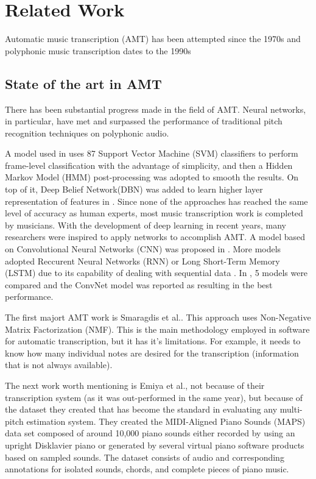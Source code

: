 \newpage
\section{Related Work}

Automatic music transcription (AMT) has been attempted since the 1970s and polyphonic music transcription dates to the 1990s \cite{REF:1}
\par

\subsection{State of the art in AMT}

There has been substantial progress made in the field of AMT. Neural networks, in particular, have met and surpassed the performance of traditional pitch recognition techniques on polyphonic audio.
\par

A model used in \cite{REF:2} uses 87 Support Vector Machine (SVM) classifiers to perform frame-level classification with the advantage of simplicity, and then a Hidden Markov Model (HMM) post-processing was adopted to smooth the results. On top of it, Deep Belief Network(DBN) was added to learn higher layer representation of features in \cite{REF:3}. Since none of the approaches has reached the same level of accuracy as human experts, most music transcription work is completed by musicians. With the development of deep learning in recent years, many researchers were inspired to apply networks to accomplish AMT. A model based on Convolutional Neural Networks (CNN) was proposed in \cite{REF:4}. More models adopted Reccurent Neural Networks (RNN) or Long Short-Term Memory (LSTM) due to its capability of dealing with sequential data \cite{REF:1} \cite{REF:5} \cite{REF:6}. In \cite{REF:7}, 5 models were compared and the ConvNet model was reported as resulting in the best performance.
\par

The first majort AMT work is Smaragdis et al.\cite{REF:8}. This approach uses Non-Negative Matrix Factorization (NMF). This is the main methodology employed in software for automatic transcription, but it has it's limitations. For example, it needs to know how many individual notes are desired for the transcription (information that is not always available).
\par

The next work worth mentioning is Emiya et al.\cite{REF:9}, not because of their transcription system (as it was out-performed in the same year), but because of the dataset they created that has become the standard in evaluating any multi-pitch estimation system. They created the MIDI-Aligned Piano Sounds (MAPS) data set composed of around 10,000 piano sounds either recorded by using an upright Disklavier piano or generated by several virtual piano software products based on sampled sounds. The dataset
consists of audio and corresponding annotations for isolated sounds, chords, and complete pieces of piano music.
\par

